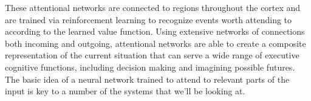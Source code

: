 



These attentional networks are connected to regions throughout the cortex and are trained via reinforcement learning to recognize events worth attending to according to the learned value function. Using extensive networks of connections {\emdash{}} both incoming and outgoing, attentional networks are able to create a composite representation of the current situation that can serve a wide range of executive cognitive functions, including decision making and imagining possible futures. The basic idea of a neural network trained to attend to relevant parts of the input is key to a number of the systems that we'll be looking at.

